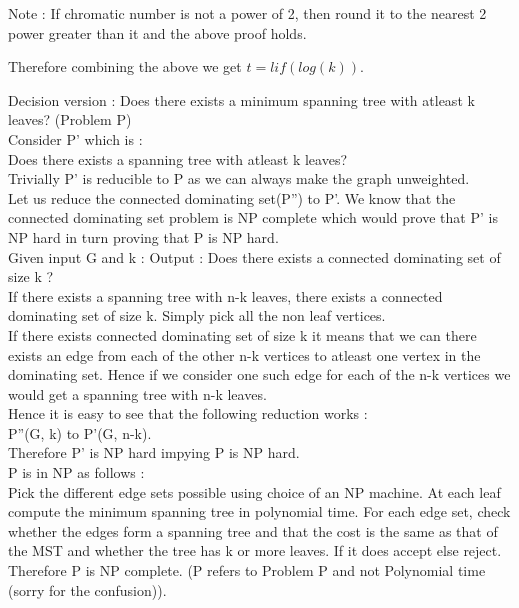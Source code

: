 \documentclass[solution,addpoints,12pt]{exam}
\begin{document}
\begin{questions}
\begin{itemize}
Note : If chromatic number is not a power of 2, then round it to the
nearest 2 power greater than it and the above proof holds.
\end{itemize}
Therefore combining the above we get $t = lif(log(k))$.

\question
Decision version : Does there exists a minimum spanning tree with atleast k leaves? (Problem P)\\
Consider P' which is :\\
Does there exists a spanning tree with atleast k leaves?\\
Trivially P' is reducible to P as we can always make the graph unweighted.\\
Let us reduce the connected dominating set(P'') to P'. We know that the connected dominating
set problem is NP complete which would prove that P' is NP hard in turn proving that P
is NP hard.\\
Given input G and k : Output : Does there exists a connected dominating
set of size k ?\\
If there exists a spanning tree with n-k leaves, there exists a connected dominating
set of size k. Simply pick all the non leaf vertices.\\
If there exists connected dominating set of size k it means that we can there
exists an edge from each of the other n-k vertices to atleast one vertex in the dominating
set. Hence if we consider one such edge for each of the n-k vertices we would get a
spanning tree with n-k leaves.\\
Hence it is easy to see that the following reduction works :\\
P''(G, k) to P'(G, n-k).\\
Therefore P' is NP hard impying P is NP hard.\\
P is in NP as follows :\\
Pick the different edge sets possible using choice of an NP machine. At
each leaf compute the minimum spanning tree in polynomial time.
For each edge set, check whether the edges form a spanning tree and that the cost is the
same as that of the MST and whether the tree has k or more leaves. If it does accept
else reject. Therefore P is NP complete.
(P refers to Problem P and not Polynomial time (sorry for the confusion)).
\end{questions}
\end{document}
